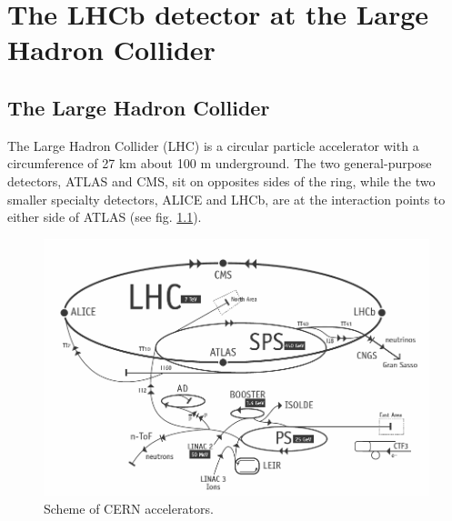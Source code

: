 \chapter{The LHCb detector at the Large Hadron Collider}
\label{sec:Detector}

\section{The Large Hadron Collider}

The Large Hadron Collider (LHC) is a circular particle accelerator with a circumference of 27 km about 100 m underground.
The two general-purpose detectors, ATLAS and CMS, sit on opposites sides of the ring, while the two smaller specialty detectors, 
ALICE and LHCb, are at the interaction points to either side of ATLAS (see fig. \ref{lhc}).

\begin{figure}[h!]
\centering
\includegraphics[width=1\textwidth]{Detector/figs/LHC_scheme.png}
\caption{Scheme of CERN accelerators.} \label{lhc}
\end{figure}

